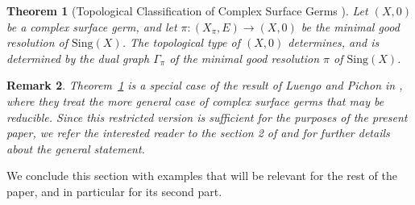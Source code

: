 \documentclass[reqno,dvipsnames,12pt]{amsart}
\newtheorem{thm}{Theorem}[section]
\newtheorem{rema}[thm]{Remark}
\begin{document}
   

\begin{thm}[Topological Classification of Complex Surface Germs \cite{Neu81, luengopichon}]\label{luengopichon}
Let $(X,0)$ be a complex surface germ, and let $\pi:(X_{\pi},E) \longrightarrow (X,0)$ be the minimal good resolution of $\mathrm{Sing}(X)$.  
The topological type of $(X,0)$ determines, and is determined by the dual graph
$\Gamma_{\pi}$ of the minimal good resolution $\pi$ of $\mathrm{Sing}(X)$.

\end{thm}
\begin{rema}
Theorem~\ref{luengopichon} is a special case of the result of Luengo and Pichon in \cite{luengopichon}, where they treat the more general case of complex surface germs that may be reducible. Since this restricted version is sufficient for the purposes of the present paper, we refer the interested reader to the section 2 of \cite{luengopichon} and \cite{michelnormalization} for further details about the general statement.
\end{rema}







We conclude this section with examples that will be relevant for the rest of the paper, and in particular for its second part.
\end{document}
